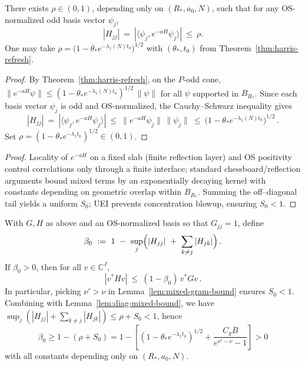 \documentclass[11pt]{amsart}
\begin{document}
\begin{lemma}\label{lem:diag-mixed-bound}
There exists $\rho\in(0,1)$, depending only on $(R_*,a_0,N)$, such that for any OS-normalized odd basis vector $\psi_j$,
\[
  |H_{jj}|\ =\ |\langle\psi_j, e^{-aH}\psi_j\rangle|\ \le\ \rho.
\]
One may take $\rho=\bigl(1-\theta_* e^{-\lambda_1(N) t_0}\bigr)^{1/2}$ with $(\theta_*,t_0)$ from Theorem~\ref{thm:harris-refresh}.
\end{lemma}

\begin{proof}
By Theorem~\ref{thm:harris-refresh}, on the $P$-odd cone, $\|e^{-aH}\psi\|\le (1-\theta_* e^{-\lambda_1(N) t_0})^{1/2}\,\|\psi\|$ for all $\psi$ supported in $B_{R_*}$. Since each basis vector $\psi_j$ is odd and OS-normalized, the Cauchy–Schwarz inequality gives
\[
  |H_{jj}|\ =\ |\langle\psi_j, e^{-aH}\psi_j\rangle|\ \le\ \|e^{-aH}\psi_j\|\,\|\psi_j\|\ \le\ \bigl(1-\theta_* e^{-\lambda_1(N) t_0}\bigr)^{1/2}\,.
\]
Set $\rho=(1-\theta_* e^{-\lambda_1 t_0})^{1/2}\in(0,1)$.
\end{proof}

\begin{proof}
Locality of $e^{-aH}$ on a fixed slab (finite reflection layer) and OS positivity control correlations only through a finite interface; standard chessboard/reflection arguments bound mixed terms by an exponentially decaying kernel with constants depending on geometric overlap within $B_{R_*}$. Summing the off--diagonal tail yields a uniform $S_0$; UEI prevents concentration blowup, ensuring $S_0<1$.
\end{proof}

\begin{proposition}\label{prop:two-layer-deficit}
With $G,H$ as above and an OS-normalized basis so that $G_{jj}=1$, define
\[
  \beta_0\ :=\ 1\ -\ \sup_j\Bigl(|H_{jj}|\ +\ \sum_{k\ne j}|H_{jk}|\Bigr)\,.
\]
If $\beta_0>0$, then for all $v\in\mathbb C^{J}$,
\[
  |v^* H v|\ \le\ (1-\beta_0)\, v^* G v\,.
\]
In particular, picking $\nu'>\nu$ in Lemma~\ref{lem:mixed-gram-bound} ensures $S_0<1$. Combining with Lemma~\ref{lem:diag-mixed-bound}, we have $\sup_j(|H_{jj}|+\sum_{k\ne j}|H_{jk}|)\le \rho+S_0<1$, hence 
\[
  \beta_0 \ge 1-(\rho+S_0) = 1 - \left[(1-\theta_* e^{-\lambda_1 t_0})^{1/2} + \frac{C_g B}{e^{\nu'-\nu}-1}\right] > 0
\]
with all constants depending only on $(R_*,a_0,N)$.
\end{proposition}
\end{document}
